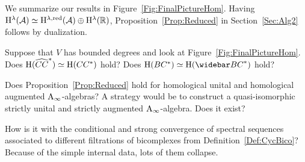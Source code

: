 \documentclass[\MainFolder/Text.tex]{subfiles}
\begin{document}
We summarize our results in Figure~\ref{Fig:FinalPictureHom}. Having $\mathrm{H}^\lambda(\mathcal{A}) \simeq \mathrm{H}^{\lambda,\mathrm{red}}(\mathcal{A}) \oplus \mathrm{H}^{\lambda}(\mathbb{R})$, Proposition~\ref{Prop:Reduced} in Section~\ref{Sec:Alg2} follows by dualization. 

\begin{Questions}\label{Q:OpenProbAInftx}
\begin{RemarkList}
\item Suppose that $V$ has bounded degrees and look at Figure~\ref{Fig:FinalPictureHom}. Does $\mathrm{H}(\widehat{CC}^*)\simeq \mathrm{H}(CC^*)$ hold? Does $\H(\ConCycBi^*)\simeq\H(\NConCycBi^*)$ hold?
\item Does Proposition~\ref{Prop:Reduced} hold for homological unital and homological augmented $\mathrm{A}_\infty$-algebras? A strategy would be to construct a quasi-isomorphic strictly unital and strictly augmented $\mathrm{A}_\infty$-algebra. Does it exist?
\item How is it with the conditional and strong convergence of spectral sequences associated to different filtrations of bicomplexes from Definition~\ref{Def:CycBico}? Because of the simple internal data, lots of them collapse.\qedhere
\end{RemarkList}
\end{Questions}
\end{document}
